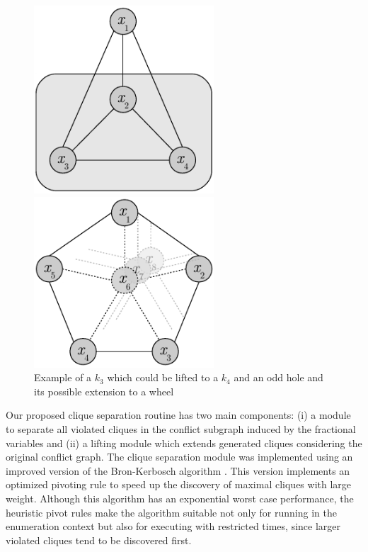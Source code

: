 \documentclass{endm}
\begin{document}
\begin{figure}	
	\begin{minipage}[h]{.5\textwidth}
		\begin{center}
			\includegraphics[width=0.6\textwidth]{clique.pdf}
		\end{center}
	\end{minipage}
	\begin{minipage}[h]{.5\textwidth}
		\begin{center}
			\includegraphics[width=0.6\textwidth]{oddHole.pdf}
		\end{center}
	\end{minipage}
	\caption{Example of a $k_{3}$ which could be lifted to a $k_{4}$    and an odd hole and its possible extension to a wheel} \label{figLiftings}
\end{figure}


Our proposed clique separation routine has two main components: (i) a module to separate all violated cliques in the conflict subgraph induced by the fractional variables and (ii) a lifting module which extends generated cliques considering the original conflict graph. The clique separation module was implemented using an improved version of the Bron-Kerbosch algorithm \cite{Bron1973}. This version implements an optimized pivoting rule \cite{Brito2011} to speed up the discovery of maximal cliques with large weight.  Although this algorithm has an exponential worst case performance, the heuristic pivot rules  make the algorithm suitable not only for running in the enumeration context but also for executing with restricted times, since larger violated cliques tend to be discovered first. 
\end{document}
